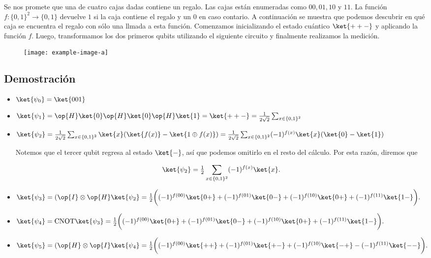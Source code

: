 \documentclass[./../main.tex]{subfiles}
\begin{document}

Se nos promete que una de cuatro cajas dadas contiene un regalo. Las cajas están enumeradas como \(00, 01, 10\) y \(11\). La función \(f \colon \{0,1\}^2 \to \{0,1\}\) devuelve \(1\) si la caja contiene el regalo y un \(0\) en caso contario.
A continuación se muestra que podemos descubrir en qué caja se encuentra el regalo con sólo una llmada a esta función. Comenzamos inicializando el estado cuántico \(\ket{++-}\) y aplicando la función \(f\). Luego, transformamos los dos primeros qubits utilizando el siguiente circuito y finalmente realizamos la medición.

\begin{figure}[htb]
	\centering
	\texttt{[image: example-image-a]}
\end{figure}

\subsection*{Demostración}

\begin{itemize}
	\item \(\ket{\psi_{0}} = \ket{001}\)
	\item \(\ket{\psi_{1}} = \op{H}\ket{0}\op{H}\ket{0}\op{H}\ket{1} = \ket{++-} = \tfrac{1}{2\sqrt{2}}\sum_{x\in \{0,1\}^{2}}\)
	\item \(\ket{\psi_{2}} = \tfrac{1}{2\sqrt{2}}\sum_{x\in \{0,1\}^{2}}\ket{x}(\ket{f(x)} -\ket{1 \oplus f(x)}) = \tfrac{1}{2\sqrt{2}}\sum_{x\in \{0,1\}^{2}}(-1)^{f(x)}\ket{x}(\ket{0} - \ket{1})\)

	      Notemos que el tercer qubit regresa al estado \(\ket{-}\), así que podemos omitirlo en el resto del cálculo. Por esta razón, diremos que

	      \begin{equation*}
		      \ket{\psi_{2}} = \tfrac{1}{2}\sum_{x\in \{0,1\}^{2}}(-1)^{f(x)}\ket{x}.
	      \end{equation*}
	\item \(\ket{\psi_{3}} = (\tensprod{\op{I}}{\op{H}}\ket{\psi_{2}} = \tfrac{1}{2}\biggl((-1)^{f(00)}\ket{0+} + (-1)^{f(01)}\ket{0-} + (-1)^{f(10)}\ket{0+} + (-1)^{f(11)}\ket{1-}\biggr).\)
	\item \(\ket{\psi_{4}} = \cnot\ket{\psi_{3}} = \tfrac{1}{2}\biggl((-1)^{f(00)}\ket{0+} + (-1)^{f(01)}\ket{0-} + (-1)^{f(10)}\ket{0+} + (-1)^{f(11)}\ket{1-}\biggr).\)
	\item \(\ket{\psi_{5}} = (\tensprod{\op{H}}{\op{I}}\ket{\psi_{4}} = \tfrac{1}{2}\biggl((-1)^{f(00)}\ket{++} + (-1)^{f(01)}\ket{+-} + (-1)^{f(10)}\ket{-+} - (-1)^{f(11)}\ket{--}\biggr).\)
\end{itemize}
\end{document}

